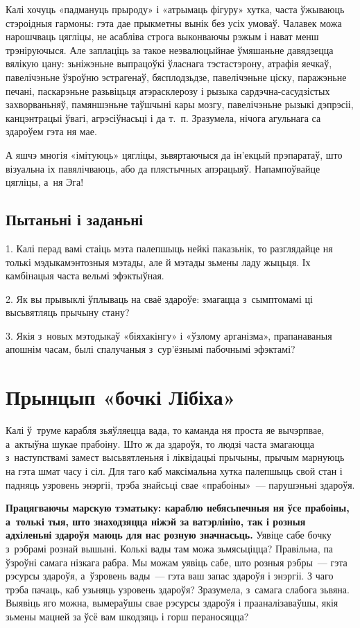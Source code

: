 Калі хочуць «падмануць прыроду» і «атрымаць фігуру» хутка, часта ўжываюць стэроідныя гармоны: гэта дае прыкметны вынік без усіх умоваў. Чалавек можа нарошчваць цягліцы, не асабліва строга выконваючы рэжым і нават менш трэніруючыся. Але заплаціць за такое неэвалюцыйнае ўмяшаньне давядзецца вялікую цану: зьніжэньне выпрацоўкі ўласнага тэстастэрону, атрафія яечкаў, павелічэньне ўзроўню эстрагенаў, бясплодзьдзе, павелічэньне ціску, паражэньне печані, паскарэньне разьвіцьця атэрасклерозу і рызыка сардэчна-сасудзістых захворваньняў, памяншэньне таўшчыні кары мозгу, павелічэньне рызыкі дэпрэсіі, канцэнтрацыі ўвагі, агрэсіўнасьці і да т.~п. Зразумела, нічога агульнага са здароўем гэта ня мае.

А яшчэ многія «імітуюць» цягліцы, зьвяртаючыся да ін'екцый прэпаратаў, што візуальна іх павялічваюць, або да плястычных апэрацыяў. Напампоўвайце цягліцы, а~ня Эга!

\subsection*{Пытаньні і заданьні}

1. Калі перад вамі стаіць мэта палепшыць нейкі паказьнік, то разглядайце ня толькі мэдыкамэнтозныя мэтады, але й мэтады зьмены ладу жыцьця. Іх камбінацыя часта вельмі эфэктыўная.

2. Як вы прывыклі ўплываць на сваё здароўе: змагацца з~сымптомамі ці высьвятляць прычыну стану?

3. Якія з~новых мэтодыкаў «біяхакінгу» і «ўзлому арганізма», прапанаваныя апошнім часам, былі спалучаныя з~сур'ёзнымі пабочнымі эфэктамі?


\section{Прынцып «бочкі Лібіха»}

Калі ў~труме карабля зьяўляецца вада, то каманда ня проста яе вычэрпвае, а~актыўна шукае прабоіну. Што ж да здароўя, то людзі часта змагаюцца з~наступствамі замест высьвятленьня і ліквідацыі прычыны, прычым марнуюць на гэта шмат часу і сіл. Для таго каб максімальна хутка палепшыць свой стан і падняць узровень энэргіі, трэба знайсьці свае «прабоіны»~--- парушэньні здароўя.

\textbf{Працягваючы марскую тэматыку: караблю небясьпечныя ня ўсе прабоіны, а~толькі тыя, што знаходзяцца ніжэй за ватэрлінію, так і розныя адхіленьні здароўя маюць для нас розную значнасьць.} Уявіце сабе бочку з~рэбрамі рознай вышыні. Колькі вады там можа зьмясьціцца? Правільна, па ўзроўні самага нізкага рабра. Мы можам уявіць сабе, што розныя рэбры~--- гэта рэсурсы здароўя, а~ўзровень вады~--- гэта ваш запас здароўя і энэргіі. З чаго трэба пачаць, каб узьняць узровень здароўя? Зразумела, з~самага слабога зьвяна. Выявіць яго можна, вымераўшы свае рэсурсы здароўя і прааналізаваўшы, якія зьмены мацней за ўсё вам шкодзяць і горш пераносяцца?

